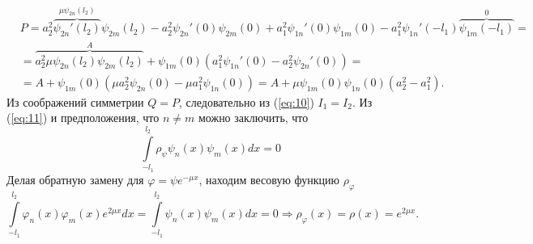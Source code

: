 \documentclass[12pt, a4paper]{article}
\begin{document}
\begin{equation}
  \begin{aligned}
    &P=a_2^2\overbrace{\psi_{2n}'(l_2)}^{\mu\psi_{2n}(l_2)}\psi_{2m}(l_2) - a_2^2 \psi_{2n}'(0) \psi_{2m}(0) + a_1^2 \psi_{1n}'(0) \psi_{1m}(0) - a_1^2 \psi_{1n}'(-l_1) \overbrace{\psi_{1m}(-l_1)}^0=\\
    & = \overbrace{a_2^2\mu\psi_{2n}(l_2)\psi_{2m}(l_2)}^{A} + \psi_{1m}(0)(a_1^2 \psi_{1n}'(0) - a_2^2\psi_{2n}'(0)) =\\
    & = A + \psi_{1m}(0)(\mu a_2^2 \psi_{2n}(0) - \mu a_1^2 \psi_{1n}(0)) = A + \mu \psi_{1m}(0)\psi_{1n}(0)(a_2^2 - a_1^2).
  \end{aligned}
\end{equation}
Из соображений симметрии $Q = P$, следовательно из (\ref{eq:10}) $I_1 = I_2$. Из (\ref{eq:11}) и предположения, что $n \ne m$ можно заключить, что
\begin{equation}
  \int \limits_{-l_1}^{l_2} \rho_\psi \psi_n(x) \psi_m(x) dx = 0
\end{equation}
Делая обратную замену для $\varphi = \psi e^{-\mu x}$, находим весовую функцию $\rho_\varphi$
\begin{equation}
  \int \limits_{-l_1}^{l_2} \varphi_n(x) \varphi_m(x) e^{2 \mu x} dx = \int \limits_{-l_1}^{l_2} \psi_n(x) \psi_m(x) dx = 0 \Rightarrow \rho_\varphi(x) = \rho(x) = e^{2 \mu x}.
\end{equation}
\end{document}
